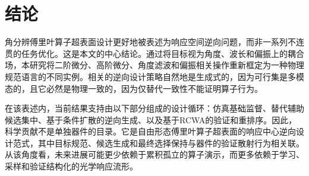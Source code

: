 \section{结论}

角分辨傅里叶算子超表面设计更好地被表述为响应空间逆向问题，而非一系列不连贯的任务优化。这是本文的中心结论。通过将目标视为角度、波长和偏振上的耦合场，本研究将二阶微分、高阶微分、角度滤波和偏振相关操作重新框定为一种物理规范语言的不同实例。相关的逆向设计策略自然地是生成式的，因为可行集是多模态的，且它必然是物理一致的，因为仅替代一致性不能证明算子行为。

在该表述内，当前结果支持由以下部分组成的设计循环：仿真基础监督、替代辅助候选集中、基于条件扩散的逆向生成、以及基于RCWA的验证和重排序。因此，科学贡献不是单独器件的目录。它是自由形态傅里叶算子超表面的响应中心逆向设计范式，其中目标规范、候选生成和最终选择保持与器件的验证散射行为相关联。从该角度看，未来进展可能更少依赖于累积孤立的算子演示，而更多依赖于学习、采样和验证结构化的光学响应流形。
